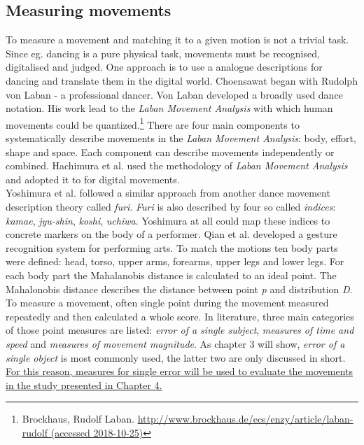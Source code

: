 \subsection{Measuring movements}
To measure a movement and matching it to a given motion is not a trivial task. Since eg. dancing is a pure physical task, movements must be recognised, digitalised and judged. One approach is to use a analogue descriptions for dancing and translate them in the digital world. Choensawat \cite{Choensawat2015} began with Rudolph von Laban - a professional dancer. Von Laban developed a broadly used dance notation. His work lead to the \textit{Laban Movement Analysis} with which human movements could be quantized.\footnote{Brockhaus, Rudolf Laban. \hyperlink{http://www.brockhaus.de/ecs/enzy/article/laban-rudolf}{http://www.brockhaus.de/ecs/enzy/article/laban-rudolf (accessed 2018-10-25)}} There are four main components to systematically describe movements in the \textit{Laban Movement Analysis}: body, effort, shape and space. Each component can describe movements independently or combined. Hachimura et al. \cite{Hachimura2004} used the methodology  of \textit{Laban Movement Analysis} and adopted it to for digital movements.\\
Yoshimura et al. \cite{Yoshimura2006} followed a similar approach from another dance movement description theory called \textit{furi}. \textit{Furi} is also described by four so called \textit{indices}: \textit{kamae}, \textit{jyu-shin}, \textit{koshi}, \textit{uchiwa}. Yoshimura at all could map these indices to concrete markers on the body of a performer. Qian et al. \cite{Qian2005} developed a gesture recognition system for performing arts. To match the motions ten body parts were defined: head, torso, upper arms, forearms, upper legs and lower legs. For each body part the Mahalanobis distance is calculated to an ideal point. The Mahalonobis distance describes the distance between point \textit{p} and distribution \textit{D}.\\
To measure a movement, often single point during the movement measured repeatedly and then calculated a whole score. In literature, three main categories of those point measures are listed: \textit{error of a single subject}, \textit{measures of time and speed} and \textit{measures of movement magnitude}. As chapter 3 will show, \textit{error of a single object} is most commonly used, the latter two are only discussed in short. \ul{For this reason, measures for single error will be used to evaluate the movements in the study presented in Chapter 4.}
